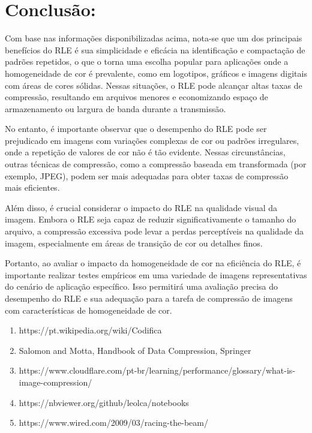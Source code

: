 \documentclass{article}
\begin{document}
\section{Conclusão:}
Com base nas informações disponibilizadas acima, nota-se que um dos principais benefícios do RLE é sua simplicidade e eficácia na identificação e compactação de padrões repetidos, o que o torna uma escolha popular para aplicações onde a homogeneidade de cor é prevalente, como em logotipos, gráficos e imagens digitais com áreas de cores sólidas. Nessas situações, o RLE pode alcançar altas taxas de compressão, resultando em arquivos menores e economizando espaço de armazenamento ou largura de banda durante a transmissão.

No entanto, é importante observar que o desempenho do RLE pode ser prejudicado em imagens com variações complexas de cor ou padrões irregulares, onde a repetição de valores de cor não é tão evidente. Nessas circunstâncias, outras técnicas de compressão, como a compressão baseada em transformada (por exemplo, JPEG), podem ser mais adequadas para obter taxas de compressão mais eficientes.

Além disso, é crucial considerar o impacto do RLE na qualidade visual da imagem. Embora o RLE seja capaz de reduzir significativamente o tamanho do arquivo, a compressão excessiva pode levar a perdas perceptíveis na qualidade da imagem, especialmente em áreas de transição de cor ou detalhes finos.

Portanto, ao avaliar o impacto da homogeneidade de cor na eficiência do RLE, é importante realizar testes empíricos em uma variedade de imagens representativas do cenário de aplicação específico. Isso permitirá uma avaliação precisa do desempenho do RLE e sua adequação para a tarefa de compressão de imagens com características de homogeneidade de cor. 



\begin{enumerate}
    \item https://pt.wikipedia.org/wiki/Codifica%
    \item Salomon and Motta, Handbook of Data Compression, Springer
    \item https://www.cloudflare.com/pt-br/learning/performance/glossary/what-is-image-compression/
    \item https://nbviewer.org/github/leolca/notebooks
    \item https://www.wired.com/2009/03/racing-the-beam/
\end{enumerate}
\end{document}
